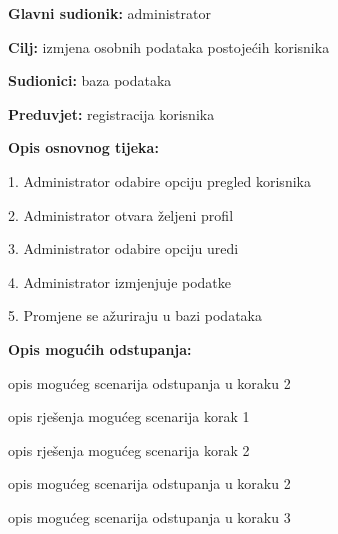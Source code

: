 					\noindent {}
					\begin{packed_item}
						
						\item \textbf{Glavni sudionik: }administrator
						\item  \textbf{Cilj:}  izmjena osobnih podataka postojećih korisnika
						\item  \textbf{Sudionici:} baza podataka
						\item  \textbf{Preduvjet:} registracija korisnika
						\item  \textbf{Opis osnovnog tijeka:}
						
						\item[] \begin{packed_enum}
							
							\item 1. Administrator odabire opciju pregled korisnika
							\item 2. Administrator otvara željeni profil
							\item 3. Administrator odabire opciju uredi
							\item 4. Administrator izmjenjuje podatke
							\item 5. Promjene se ažuriraju u bazi podataka
						\end{packed_enum}
						
						\item  \textbf{Opis mogućih odstupanja:}
						
						\item[] \begin{packed_item}
							
							\item[2.a] opis mogućeg scenarija odstupanja u koraku 2
							\item[] \begin{packed_enum}
								
								\item opis rješenja mogućeg scenarija korak 1
								\item opis rješenja mogućeg scenarija korak 2
								
							\end{packed_enum}
							\item[2.b] opis mogućeg scenarija odstupanja u koraku 2
							\item[3.a] opis mogućeg scenarija odstupanja  u koraku 3
							
						\end{packed_item}
					\end{packed_item}
					
